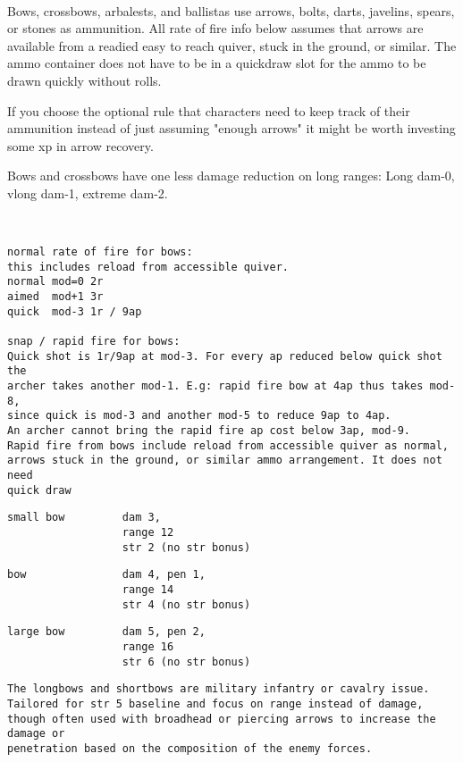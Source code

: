\


\noindent Bows, crossbows, arbalests, and ballistas use arrows, bolts, darts, javelins, spears, or stones as ammunition. All rate of fire info below assumes that arrows are available from a readied easy to reach quiver, stuck in the ground, or similar. The ammo container does not have to be in a quickdraw slot for the ammo to be drawn quickly without rolls.

If you choose the optional rule that characters need to keep track of their ammunition instead of just assuming "enough arrows" it might be worth investing some xp in arrow recovery.

Bows and crossbows have one less damage reduction on long ranges: Long dam-0, vlong dam-1, extreme dam-2.

\

\goodbreak \small \begin{samepage} \begin{verbatim}
normal rate of fire for bows:
this includes reload from accessible quiver.
normal mod=0 2r
aimed  mod+1 3r
quick  mod-3 1r / 9ap

snap / rapid fire for bows:
Quick shot is 1r/9ap at mod-3. For every ap reduced below quick shot the
archer takes another mod-1. E.g: rapid fire bow at 4ap thus takes mod-8,
since quick is mod-3 and another mod-5 to reduce 9ap to 4ap.
An archer cannot bring the rapid fire ap cost below 3ap, mod-9.
Rapid fire from bows include reload from accessible quiver as normal,
arrows stuck in the ground, or similar ammo arrangement. It does not need
quick draw
\end{verbatim} \blocklistgap \begin{verbatim}
small bow         dam 3,
                  range 12
                  str 2 (no str bonus)
\end{verbatim} \blocklistgap \begin{verbatim}
bow               dam 4, pen 1,
                  range 14
                  str 4 (no str bonus)
\end{verbatim} \blocklistgap \begin{verbatim}
large bow         dam 5, pen 2,
                  range 16
                  str 6 (no str bonus)
\end{verbatim} \blocklistgap \begin{verbatim}
The longbows and shortbows are military infantry or cavalry issue.
Tailored for str 5 baseline and focus on range instead of damage,
though often used with broadhead or piercing arrows to increase the damage or
penetration based on the composition of the enemy forces.


\end{verbatim}
\end{samepage}
